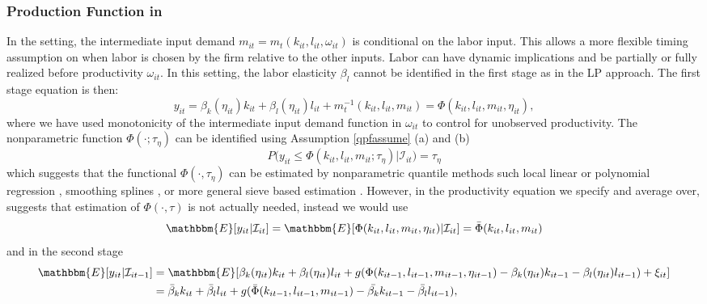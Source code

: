 \documentclass[11pt]{article}
\begin{document}
\subsubsection{Production Function in \cite{Ackerberg2015}}
In the \cite{Ackerberg2015} setting, the intermediate input demand $m_{it}=m_{t}(k_{it}, l_{it}, \omega_{it})$ is conditional on the labor input. This allows a more flexible timing assumption on when labor is chosen by the firm relative to the other inputs. Labor can have dynamic implications and be partially or fully realized before productivity $\omega_{it}$. In this setting, the labor elasticity $\beta_{l}$ cannot be identified in the first stage as in the LP approach. The first stage equation is then:
\begin{equation}\label{acf1}
y_{it}=\beta_{k}(\eta_{it})k_{it}+\beta_{l}(\eta_{it})l_{it}+m_{t}^{-1}(k_{it}, l_{it}, m_{it})=\Phi(k_{it}, l_{it}, m_{it}, \eta_{it}),
\end{equation}
where we have used monotonicity of the intermediate input demand function in $\omega_{it}$ to control for unobserved productivity. The nonparametric function $\Phi(\cdot;\tau_{\eta})$ can be identified using Assumption \eqref{qpfassume} (a) and (b)
\begin{equation} \label{acfqpf1}
P\big(y_{it}\leq \Phi(k_{it}, l_{it}, m_{it}; \tau_{\eta})\big|\mathcal{I}_{it})=\tau_{\eta}
\end{equation}
which suggests that the functional $\Phi(\cdot, \tau_{\eta})$ can be estimated by nonparametric quantile methods such local linear or polynomial regression \citep{Chaudhuri1991,Chaudhuri1991a}, smoothing splines \citep{KOENKER1994}, or more general sieve based estimation \citep{2012a}. However, in the productivity equation we specify and average over, suggests that estimation of $\Phi(\cdot, \tau)$ is not actually needed, instead we would use
\begin{equation}\label{ACFmean1}
\mathbbm{E}[y_{it}|\mathcal{I}_{it}]=\mathbbm{E}[\Phi(k_{it}, l_{it}, m_{it}, \eta_{it})|\mathcal{I}_{it}]=\bar{\Phi}(k_{it}, l_{it}, m_{it})
\end{equation}
and in the second stage
\begin{equation}\label{ACFmean2}
\begin{split}
\mathbbm{E}[y_{it}|\mathcal{I}_{it-1}]&=\mathbbm{E}[\beta_{k}(\eta_{it})k_{it}+\beta_{l}(\eta_{it})l_{it}+g(\Phi(k_{it-1}, l_{it-1}, m_{it-1}, \eta_{it-1})-\beta_{k}(\eta_{it})k_{it-1}-\beta_{l}(\eta_{it})l_{it-1})+\xi_{it}]\\
&=\bar{\beta}_{k}k_{it}+\bar{\beta}_{l}l_{it}+g(\bar{\Phi}(k_{it-1}, l_{it-1}, m_{it-1})-\bar{\beta_{k}}k_{it-1}-\bar{\beta_{l}}l_{it-1}),
\end{split}
\end{equation}
\end{document}

